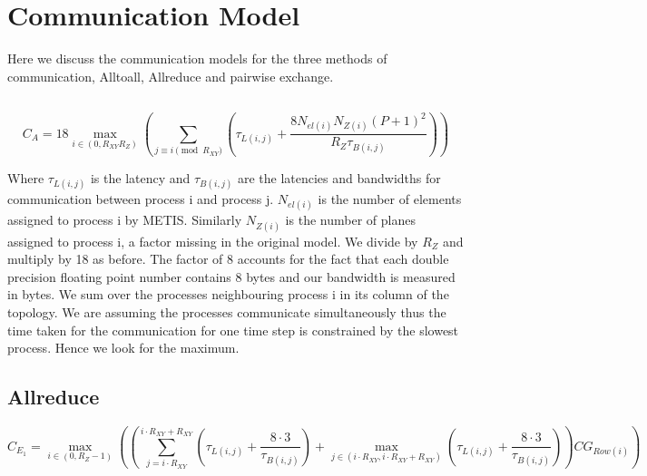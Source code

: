 
\chapter{Communication Model} %

\label{Chapter6} %

Here we discuss the communication models for the three methods of communication, Alltoall, Allreduce and pairwise exchange.

\section{}

\begin{equation}
C_A = 18\max_{i \in (0, R_{XY} R_Z)}\left(\sum_{j \equiv i \pmod{R_{XY}}} \left(\tau_{L(i,j)} + \frac{8N_{el(i)}N_{Z(i)}(P+1)^2}{R_Z \tau_{B(i,j)}}\right) \right)
\end{equation}

Where \(\tau_{L(i,j)}\) is the latency and \(\tau_{B(i,j)}\) are the latencies and bandwidths for communication between process i and process j. \(N_{el(i)}\) is the number of elements assigned to process i by METIS. Similarly \(N_{Z(i)}\) is the number of planes assigned to process i, a factor missing in the original model. We divide by \(R_Z\) and multiply by 18 as before. The factor of 8 accounts for the fact that each double precision floating point number contains 8 bytes and our bandwidth is measured in bytes. We sum over the processes neighbouring process i in its column of the topology. We are assuming the processes communicate simultaneously thus the time taken for the communication for one time step is constrained by the slowest process. Hence we look for the maximum. 

\section{Allreduce}
\begin{equation}
C_{E_1}  =  \max_{i \in (0, R_{Z} - 1)} \left( \left( \sum_{j = i \cdot R_{XY}}^{i \cdot R_{XY} + R_{XY}} \left(\tau_{L(i,j)} + \frac{8 \cdot 3}{\tau_{B(i,j)}} \right) + \max_{j \in (i \cdot R_{XY}, i \cdot R_{XY} + R_{XY})} \left(\tau_{L(i,j)} + \frac{8 \cdot 3}{\tau_{B(i,j)}} \right) \right) CG_{Row(i)}  \right)
\end{equation}

